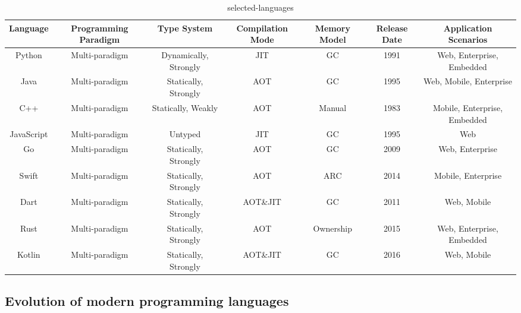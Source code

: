 \begin{table}[ht]
    \caption{selected-languages}
    \label{tab:selected-languages}
    \begin{center}
        \begin{tabular}{ccccccc}
            \toprule
            Language & Programming Paradigm & Type System & Compilation Mode & Memory Model &
            Release Date & Application Scenarios \\
            \midrule
            Python & Multi-paradigm & Dynamically, Strongly & JIT & GC & 1991 & Web,
            Enterprise, Embedded \\
            Java & Multi-paradigm & Statically, Strongly & AOT & GC & 1995 & Web,
            Mobile, Enterprise \\
            C++ & Multi-paradigm & Statically, Weakly & AOT & Manual & 1983 & Mobile,
            Enterprise, Embedded \\
            JavaScript & Multi-paradigm & Untyped & JIT & GC & 1995 &
            Web \\
            Go & Multi-paradigm & Statically, Strongly & AOT & GC & 2009 & Web,
            Enterprise \\
            Swift & Multi-paradigm & Statically, Strongly & AOT & ARC & 2014 &
            Mobile, Enterprise \\
            Dart & Multi-paradigm & Statically, Strongly & AOT\&JIT & GC & 2011 &
            Web, Mobile \\
            Rust & Multi-paradigm & Statically, Strongly & AOT & Ownership & 2015 &
            Web, Enterprise, Embedded \\
            Kotlin & Multi-paradigm & Statically, Strongly & AOT\&JIT & GC & 2016 &
            Web, Mobile \\
            \bottomrule
        \end{tabular}
    \end{center}
\end{table}

\subsection{Evolution of modern programming languages}

